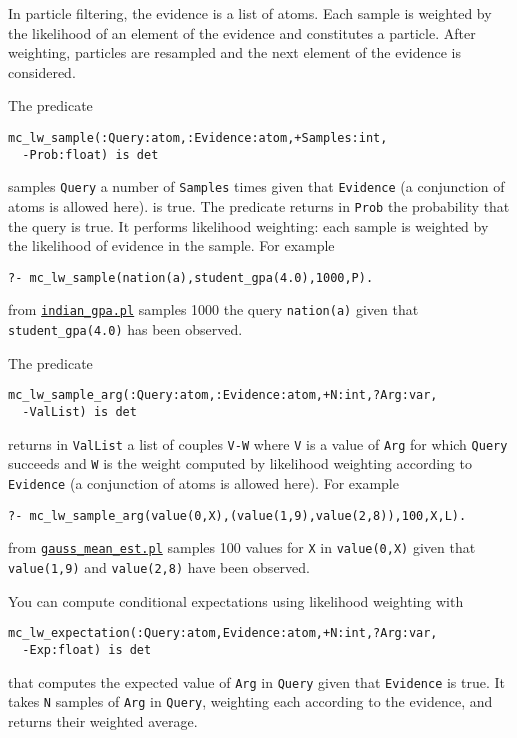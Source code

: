 In particle filtering, the evidence is a list of atoms. Each sample is weighted by the
likelihood of an element of the evidence and constitutes a particle.
After weighting, particles are resampled and the next element of the evidence
is considered.

 The predicate
\begin{verbatim}
mc_lw_sample(:Query:atom,:Evidence:atom,+Samples:int,
  -Prob:float) is det
\end{verbatim}
samples \verb|Query|  a number of \verb|Samples| times given that \verb|Evidence|
(a conjunction of atoms is allowed here). is true.
The predicate returns in \verb|Prob| the probability that the query is true.
It performs likelihood weighting: each sample is weighted by the
likelihood of evidence in the sample.
For example
\begin{verbatim}
?- mc_lw_sample(nation(a),student_gpa(4.0),1000,P).
\end{verbatim}
from \href{http://cplint.eu/example/inference/indian_gpa.pl}{\texttt{indian\_gpa.pl}} samples 1000 the query
\verb|nation(a)| given that \verb|student_gpa(4.0)| has been observed.


 The predicate
\begin{verbatim}
mc_lw_sample_arg(:Query:atom,:Evidence:atom,+N:int,?Arg:var,
  -ValList) is det
\end{verbatim}
returns in \verb|ValList| a list of couples \verb|V-W| where \verb|V| is a value of \verb|Arg|
for which \verb|Query| succeeds and \verb|W| is the
weight computed by likelihood weighting
according to \verb|Evidence| (a conjunction of atoms is allowed here).
For example
\begin{verbatim}
?- mc_lw_sample_arg(value(0,X),(value(1,9),value(2,8)),100,X,L).
\end{verbatim}
from \href{http://cplint.eu/example/inference/gauss_mean_est.pl}{\texttt{gauss\_mean\_est.pl}} samples 100 values for \verb|X| in
\verb|value(0,X)| given that \verb|value(1,9)| and \verb|value(2,8)| have been observed.

You can compute conditional expectations using likelihood weighting with
\begin{verbatim}
mc_lw_expectation(:Query:atom,Evidence:atom,+N:int,?Arg:var,
  -Exp:float) is det
\end{verbatim}
that computes the expected value of \verb|Arg| in \verb|Query| given that
\verb|Evidence| is true.
It takes \verb|N| samples of  \verb|Arg| in \verb|Query|, weighting each according
to the evidence, and returns their weighted average.



